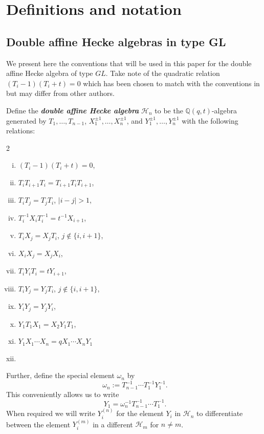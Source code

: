 \documentclass[ALCO,Unicode]{cedram}
\begin{document}
\section{Definitions and notation}\label{defn and notations}

\subsection{Double affine Hecke algebras in type GL}

We present here the conventions that will be used in this paper for the double affine Hecke algebra of type $GL$. Take note of the quadratic relation $(T_{i}-1)(T_{i}+t) = 0$ which has been chosen to match with the conventions in \cite{Ion_2022} but may differ from other authors.

\begin{defi} \label{defn1}
Define the \textbf{\textit{double affine Hecke algebra}} $\mathscr{H}_n$ to be the $\mathbb{Q}(q,t)$-algebra generated by $T_1,\ldots,T_{n-1}$, $X_1^{\pm 1},\ldots,X_{n}^{\pm 1}$, and $Y_1^{\pm 1},\ldots,Y_n^{\pm 1}$ with the following relations:



\begin{multicols}{2}
\begin{enumerate}[(i)]
    \item  
    \label{def-i} 
    $(T_i -1)(T_i +t) = 0$,
    \item [] $T_iT_{i+1}T_i = T_{i+1}T_iT_{i+1}$,
    \item [] $T_iT_j = T_jT_i$, $|i-j|>1$,
    \item 
    \label{def-ii} $T_i^{-1}X_iT_i^{-1} = t^{-1}X_{i+1}$,
    \item []$T_iX_j = X_jT_i$, $j \notin \{i,i+1\}$,
    \item []$X_iX_j = X_jX_i$,
    \item 
    \label{def-iii}$T_iY_iT_i = tY_{i+1}$,
    \item []$T_iY_j = Y_jT_i$, $j\notin \{i,i+1\}$,
    \item []$Y_iY_j = Y_jY_i$,
    \item 
    \label{def-iv}$Y_1T_1X_1 = X_2Y_1T_1$,
    \item 
    \label{def-v}$Y_1X_1\cdots X_n = qX_1\cdots X_nY_1$
    \item []
\end{enumerate}
\end{multicols}


Further, define the special element $\omega_n$ by $$\omega_n := T_{n-1}^{-1}\cdots T_1^{-1}Y_1^{-1}.$$ This conveniently allows us to write $$Y_1 = \omega_n^{-1}T_{n-1}^{-1}\cdots T_1^{-1}.$$ When required we will write $Y_i^{(n)}$ for the element $Y_i$ in $\mathscr{H}_n$ to differentiate between the element $Y_i^{(m)}$ in a different $\mathscr{H}_m$ for $n \neq m$.
\end{defi}
\end{document}
